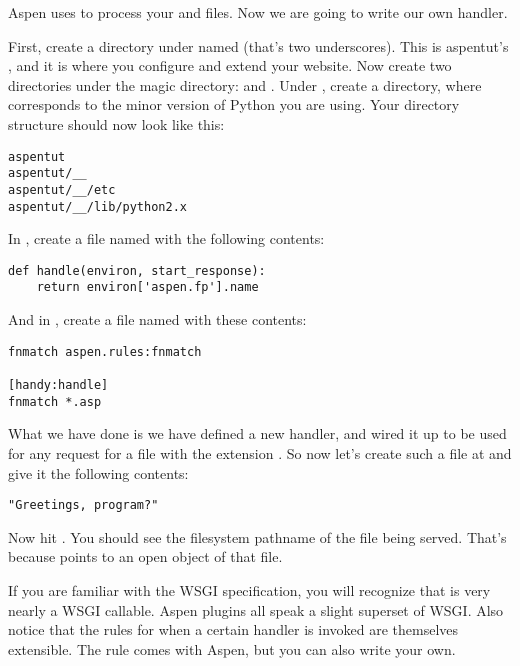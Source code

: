 Aspen uses  to process your  and 
files. Now we are going to write our own handler.

First, create a directory under  named \file{__} (that's two
underscores). This is aspentut's , and it is where you
configure and extend your website. Now create two directories under the magic
directory:  and . Under , create a
 directory, where  corresponds to the minor version of
Python you are using. Your directory structure should now look like this:

\begin{verbatim}
aspentut
aspentut/__
aspentut/__/etc
aspentut/__/lib/python2.x
\end{verbatim}

In , create a file named  with the
following contents:

\begin{verbatim}
def handle(environ, start_response):
    return environ['aspen.fp'].name
\end{verbatim}

And in , create a file named  with these
contents:

\begin{verbatim}
fnmatch aspen.rules:fnmatch

[handy:handle]
fnmatch *.asp
\end{verbatim}

What we have done is we have defined a new handler, and wired it up to be used
for any request for a file with the extension . So now let's create
such a file at  and give it the following contents:

\begin{verbatim}
"Greetings, program?"
\end{verbatim}

Now hit . You should see the filesystem
pathname of the file being served. That's because 
points to an open  object of that file.

If you are familiar with the WSGI specification, you will recognize that
 is very nearly a WSGI callable. Aspen plugins all speak
a slight superset of WSGI. Also notice that the rules for when a certain handler
is invoked are themselves extensible. The  rule comes with Aspen,
but you can also write your own.



